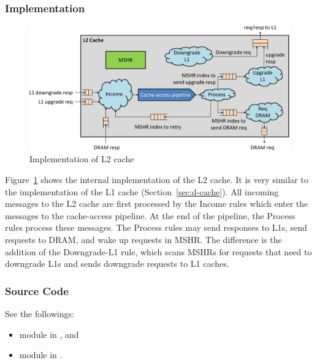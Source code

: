 \subsubsection{Implementation}

\begin{figure}
    \centering
    \includegraphics[width=\columnwidth]{fig/l2_cache_crop.pdf}
    \caption{Implementation of L2 cache}\label{fig:l2-cache-impl}
\end{figure}

Figure~\ref{fig:l2-cache-impl} shows the internal implementation of the L2 cache.
It is very similar to the implementation of the L1 cache (Section~\ref{sec:d-cache}).
All incoming messages to the L2 cache are first processed by the Income rules which enter the messages to the cache-access pipeline.
At the end of the pipeline, the Process rules process these messages.
The Process rules may send responses to L1s, send requests to DRAM, and wake up requests in MSHR.
The difference is the addition of the Downgrade-L1 rule, which scans MSHRs for requests that need to downgrade L1s and sends downgrade requests to L1 caches.

\subsubsection{Source Code}
See the followings:
\begin{itemize}
    \item module  in , and
    \item module  in .
\end{itemize}
